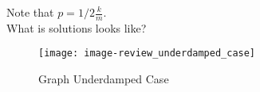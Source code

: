 Note that $p = 1/2 \frac{k}{m}$. \\
What is solutions looks like?
\begin{figure}[ht!]
  \centering
  \texttt{[image: image-review\_underdamped\_case]}
  \caption{Graph Underdamped Case }
\end{figure}

